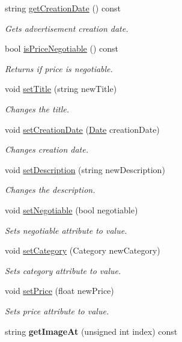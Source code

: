 \begin{DoxyCompactItemize}
string \hyperlink{class_advertisement_aae882e292b1ddcad797df1d4b4766073}{get\+Creation\+Date} () const 
\begin{DoxyCompactList}\small\item\em Gets advertisement creation date. \end{DoxyCompactList}\item 
bool \hyperlink{class_advertisement_a872ed609f23386fa5b26913a1d78036a}{is\+Price\+Negotiable} () const 
\begin{DoxyCompactList}\small\item\em Returns if price is negotiable. \end{DoxyCompactList}\item 
void \hyperlink{class_advertisement_a22bc67410075fb1d7121ebe641da460e}{set\+Title} (string new\+Title)
\begin{DoxyCompactList}\small\item\em Changes the title. \end{DoxyCompactList}\item 
void \hyperlink{class_advertisement_a6313190818f1e4177bedeab6077e8fd7}{set\+Creation\+Date} (\hyperlink{class_date}{Date} creation\+Date)
\begin{DoxyCompactList}\small\item\em Changes creation date. \end{DoxyCompactList}\item 
void \hyperlink{class_advertisement_acaf414adece9bb3ca2077354e15ab626}{set\+Description} (string new\+Description)
\begin{DoxyCompactList}\small\item\em Changes the description. \end{DoxyCompactList}\item 
void \hyperlink{class_advertisement_a99c97180458c86d517cbbf35d960994f}{set\+Negotiable} (bool negotiable)
\begin{DoxyCompactList}\small\item\em Sets negotiable attribute to value. \end{DoxyCompactList}\item 
void \hyperlink{class_advertisement_ad9ba4dc7b74aea1e4bdd12d60322453c}{set\+Category} (Category new\+Category)
\begin{DoxyCompactList}\small\item\em Sets category attribute to value. \end{DoxyCompactList}\item 
void \hyperlink{class_advertisement_af47b69a36414d09f24bc2e9173e4ab8b}{set\+Price} (float new\+Price)
\begin{DoxyCompactList}\small\item\em Sets price attribute to value. \end{DoxyCompactList}\item 
\hypertarget{class_advertisement_a260fbb1a64495a5e99591202389744a0}{}string {\bfseries get\+Image\+At} (unsigned int index) const \label{class_advertisement_a260fbb1a64495a5e99591202389744a0}


\end{DoxyCompactItemize}
